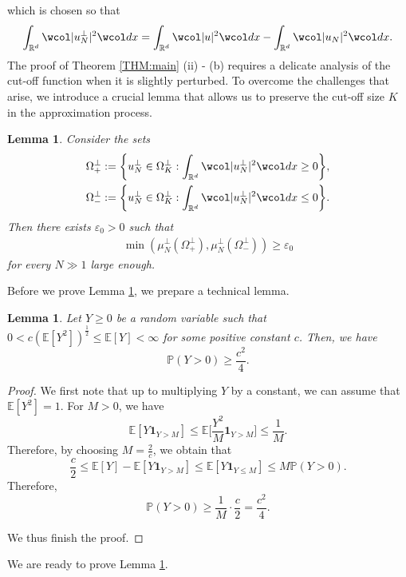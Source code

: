 \documentclass[%
11pt,  reqno]{amsart}
\newtheorem{lemma}[theorem]{Lemma}
\theoremstyle{remarkstyle}
\newcommand{\1}{\hspace{0.2mm}\text{I}\hspace{0.2mm}}
\newcommand{\noi}{\noindent}
\newcommand{\R}{\mathbb{R}}
\newcommand{\E}{\mathbb{E}}
\newcommand{\eps}{\varepsilon}
\newcommand{\wick}[1]{\wcol#1\wcol}
\renewcommand{\O}{\Omega}
\newcommand{\ind}{\mathbf 1}
\numberwithin{equation}{section}
\numberwithin{theorem}{section}
\begin{document}
	\noi
	which is chosen so that 
	$$ \int_{\R^d} \wick{|u_N^\perp|^2}dx = \int_{\R^d} \wick{|u|^2}dx - \int_{\R^d} \wick{|u_N|^2}dx. $$
	The proof of Theorem \ref{THM:main} (ii) - (b) requires a delicate analysis of the cut-off function when it is slightly perturbed. To overcome the challenges that arise, we introduce a crucial lemma that allows us to preserve the cut-off size $K$ in the approximation process. 
	\begin{lemma} \label{LEM:sameK}
		Consider the sets 
		\begin{gather*} 
			\O_{+}^\perp := \bigg\{ u_N^\perp \in \O_K^\perp : \int_{\R^d} \wick{|u_N^\perp|^2}dx \ge 0 \bigg\}, \\ 
			\Omega_{-}^\perp := \bigg\{ u_N^\perp \in \O_K^\perp : \int_{\R^d} \wick{|u_N^\perp|^2}dx \le 0 \bigg\} .
		\end{gather*}
		Then there exists $\eps_0 > 0$ such that 
		\begin{align} 
			\label{sameK_1}
			\min(\mu_N^\perp(\O_+^\perp), \mu_N^\perp(\O_-^\perp)) \ge \eps_0 
		\end{align}
		for every $N \gg 1$ large enough.
	\end{lemma}
	
	Before we prove Lemma \ref{LEM:sameK}, we prepare a technical lemma.
	\begin{lemma}
		\label{LEM:tech}
		Let $Y \ge 0$ be a random variable such that $0 <  c (\E[Y^2])^{\frac12} \le \E[Y]  < \infty$ for some positive constant $c$. 
		Then, we have
		$$ \mathbb P(Y > 0) \ge \frac{c^2}{4}. $$
	\end{lemma}
	
	\begin{proof} 
		We first note that up to multiplying $Y$ by a constant, we can assume that $\E[Y^2] = 1$. For $M > 0$, we have 
		$$\E[Y\ind_{Y > M}] \le \E\bigg[\frac{Y^2}{M}\ind_{Y > M} \bigg] \le \frac{1}{M}. $$
		Therefore, by choosing $M= \frac{2}{c}$, we obtain that 
		$$ \frac c 2 \le \E [Y] - \E [Y \ind_{Y > M}] \le \E[Y\ind_{Y \le M}] \le M \mathbb P(Y>0).  $$
		Therefore, 
		$$ \mathbb P(Y>0) \ge \frac{1}{M} \cdot \frac {c}{2} = \frac{c^2}{4}. $$
		
		\noi 
		We thus finish the proof.
	\end{proof} 
	
	We are ready to prove Lemma \ref{LEM:sameK}.
	
\end{document}
